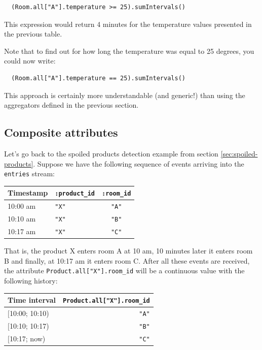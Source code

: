 \documentclass{report}
\begin{document}
\begin{lstlisting}
  (Room.all["A"].temperature >= 25).sumIntervals()
\end{lstlisting}

This expression would return 4 minutes for the temperature values
presented in the previous table.

Note that to find out for how long the temperature was equal to 25
degrees, you could now write:

\begin{lstlisting}
  (Room.all["A"].temperature == 25).sumIntervals()
\end{lstlisting}

This approach is certainly more understandable (and generic!) than
using the aggregators defined in the previous section.

\subsection{Composite attributes}

Let's go back to the spoiled products detection example from section
\ref{sec:spoiled-products}. Suppose we have the following
sequence of events arriving into the \verb=entries= stream:

\begin{tabular}{ |l|l|c| }
  \hline
  Timestamp & \verb=:product_id= & \verb=:room_id= \\
  \hline
  10:00 am & \verb="X"= & \verb="A"= \\
  10:10 am & \verb="X"= & \verb="B"= \\
  10:17 am & \verb="X"= & \verb="C"= \\
  \hline
\end{tabular}

That is, the product X enters room A at 10 am, 10 minutes later it
enters room B and finally, at 10:17 am it enters room C. After all
these events are received, the attribute
\verb=Product.all["X"].room_id= will be a continuous value with the
following history:

\begin{tabular}{ |l|r| }
  \hline
  Time interval & \verb=Product.all["X"].room_id= \\
  \hline
  $[$10:00; 10:10) & \verb="A"= \\
  $[$10:10; 10:17) & \verb="B"= \\
  $[$10:17;   now) & \verb="C"= \\
  \hline
\end{tabular}
\end{document}
